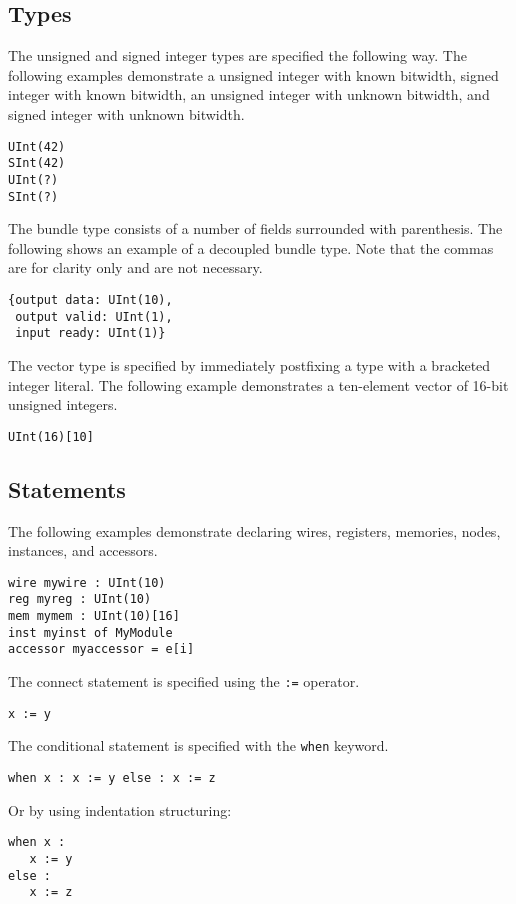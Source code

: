 \documentclass[12pt]{article}
\begin{document}
\subsection*{Types}
The unsigned and signed integer types are specified the following way. The following examples demonstrate a unsigned integer with known bitwidth, signed integer with known bitwidth, an unsigned integer with unknown bitwidth, and signed integer with unknown bitwidth.
\begin{verbatim}
UInt(42)
SInt(42)
UInt(?)
SInt(?)
\end{verbatim}

The bundle type consists of a number of fields surrounded with parenthesis. The following shows an example of a decoupled bundle type. Note that the commas are for clarity only and are not necessary.
\begin{verbatim}
{output data: UInt(10),
 output valid: UInt(1),
 input ready: UInt(1)} 
\end{verbatim}

The vector type is specified by immediately postfixing a type with a bracketed integer literal. The following example demonstrates a ten-element vector of 16-bit unsigned integers.
\begin{verbatim}
UInt(16)[10]
\end{verbatim}

\subsection*{Statements}
The following examples demonstrate declaring wires, registers, memories, nodes, instances, and accessors. 
\begin{verbatim}
wire mywire : UInt(10)
reg myreg : UInt(10)
mem mymem : UInt(10)[16]
inst myinst of MyModule
accessor myaccessor = e[i]
\end{verbatim}

The connect statement is specified using the \verb|:=| operator.
\begin{verbatim}
x := y
\end{verbatim}

The conditional statement is specified with the \verb|when| keyword.
\begin{verbatim}
when x : x := y else : x := z
\end{verbatim}
Or by using indentation structuring:
\begin{verbatim}
when x :
   x := y
else :
   x := z
\end{verbatim}
\end{document}
